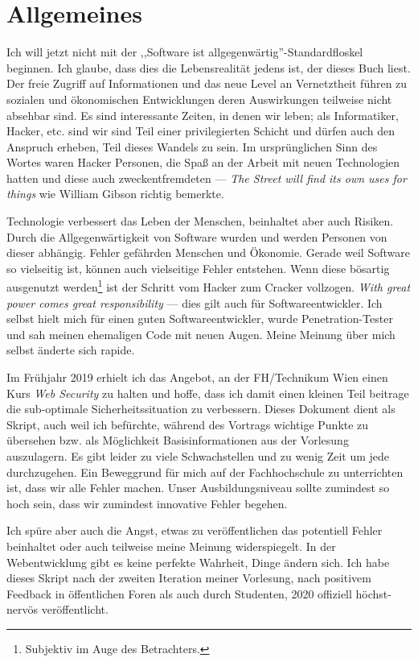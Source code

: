 \chapter{Allgemeines}

Ich will jetzt nicht mit der ,,Software ist allgegenwärtig''-Standardfloskel beginnen. Ich glaube, dass dies die Lebensrealität jedens ist, der dieses Buch liest. Der freie Zugriff auf Informationen und das neue Level an Vernetztheit führen zu sozialen und ökonomischen Entwicklungen deren Auswirkungen teilweise nicht absehbar sind. Es sind interessante Zeiten, in denen wir leben; als Informatiker, Hacker, etc. sind wir sind Teil einer privilegierten Schicht und dürfen auch den Anspruch erheben, Teil dieses Wandels zu sein. Im ursprünglichen Sinn des Wortes waren Hacker Personen, die Spaß an der Arbeit mit neuen Technologien hatten und diese auch zweckentfremdeten --- \textit{The Street will find its own uses for things} wie William Gibson richtig bemerkte.

Technologie verbessert das Leben der Menschen, beinhaltet aber auch Risiken. Durch die Allgegenwärtigkeit von Software wurden und werden Personen von dieser abhängig. Fehler gefährden Menschen und Ökonomie. Gerade weil Software so vielseitig ist, können auch vielseitige Fehler entstehen. Wenn diese bösartig ausgenutzt werden\footnote{Subjektiv im Auge des Betrachters.} ist der Schritt vom Hacker zum Cracker vollzogen. \textit{With great power comes great responsibility} --- dies gilt auch für Softwareentwickler. Ich selbst hielt mich für einen guten Softwareentwickler, wurde Penetration-Tester und sah meinen ehemaligen Code mit neuen Augen. Meine Meinung über mich selbst änderte sich rapide.

Im Frühjahr 2019 erhielt ich das Angebot, an der FH/Technikum Wien einen Kurs \textit{Web Security} zu halten und hoffe, dass ich damit einen kleinen Teil beitrage die sub-optimale Sicherheitssituation zu verbessern. Dieses Dokument dient als Skript, auch weil ich befürchte, während des Vortrags wichtige Punkte zu übersehen bzw. als Möglichkeit Basisinformationen aus der Vorlesung auszulagern. Es gibt leider zu viele Schwachstellen und zu wenig Zeit um jede durchzugehen. Ein Beweggrund für mich auf der Fachhochschule zu unterrichten ist, dass wir alle Fehler machen. Unser Ausbildungsniveau sollte zumindest so hoch sein, dass wir zumindest innovative Fehler begehen.

Ich spüre aber auch die Angst, etwas zu veröffentlichen das potentiell Fehler beinhaltet oder auch teilweise meine Meinung widerspiegelt. In der Webentwicklung gibt es keine perfekte Wahrheit, Dinge ändern sich. Ich habe dieses Skript nach der zweiten Iteration meiner Vorlesung, nach positivem Feedback in öffentlichen Foren als auch durch Studenten, 2020 offiziell höchst-nervös veröffentlicht.

